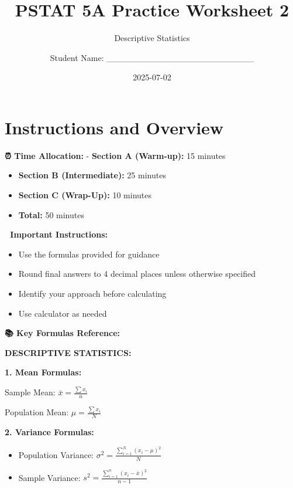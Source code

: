 \documentclass[
  11pt,
]{article}
\title{PSTAT 5A Practice Worksheet 2}
\subtitle{Descriptive Statistics}
\author{Student Name: \_\_\_\_\_\_\_\_\_\_\_\_\_\_\_\_\_\_\_\_\_\_\_\_}
\date{2025-07-02}
\renewcommand*\contentsname{Table of contents}
\newcommand\contentsname{Table of contents}
\begin{document}
\maketitle

\renewcommand*\contentsname{Table of contents}
{
\hypersetup{linkcolor=}
\setcounter{tocdepth}{3}
\tableofcontents
}

\section{Instructions and Overview}\label{instructions-and-overview}

\textbf{⏰ Time Allocation:} - \textbf{Section A (Warm-up):} 15 minutes

\begin{itemize}
\item
  \textbf{Section B (Intermediate):} 25 minutes
\item
  \textbf{Section C (Wrap-Up):} 10 minutes
\item
  \textbf{Total:} 50 minutes
\end{itemize}

\textbf{📝 Important Instructions:}

\begin{itemize}
\item
  Use the formulas provided for guidance
\item
  Round final answers to 4 decimal places unless otherwise specified
\item
  Identify your approach before calculating
\item
  Use calculator as needed
\end{itemize}

\textbf{📚 Key Formulas Reference:}

\textbf{DESCRIPTIVE STATISTICS:}

\textbf{1. Mean Formulas:}

Sample Mean: \(\bar x = \frac{\sum x_i}{n}\)

Population Mean: \(\mu = \frac{\sum x_i}{N}\)

\textbf{2. Variance Formulas:}

\begin{itemize}
\item
  Population Variance:
  \(\sigma^2 = \frac{\sum_{i=1}^{N} (x_i - \mu)^2}{N}\)
\item
  Sample Variance:
  \(s^2 = \frac{\sum_{i=1}^{n} (x_i - \bar{x})^2}{n-1}\)
\end{itemize}
\end{document}
